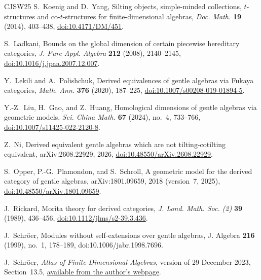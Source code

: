 \documentclass[11pt]{amsart}
\theoremstyle{definition}
\theoremstyle{plain}
\theoremstyle{definition}
\theoremstyle{definition}
\begin{document}
\begin{thebibliography}{CJSW25}
S.~Koenig and D.~Yang,
\newblock Silting objects, simple-minded collections, $t$-structures and
co-$t$-structures for finite-dimensional algebras,
\newblock \emph{Doc. Math.} \textbf{19} (2014), 403--438,
\newblock \href{https://doi.org/10.4171/DM/451}
{doi:10.4171/DM/451}.

S.~Ladkani,
\newblock Bounds on the global dimension of certain piecewise hereditary
categories,
\newblock \emph{J. Pure Appl. Algebra} \textbf{212} (2008), 2140--2145,
\newblock \href{https://doi.org/10.1016/j.jpaa.2007.12.007}
{doi:10.1016/j.jpaa.2007.12.007}.

Y.~Lekili and A.~Polishchuk,
\newblock Derived equivalences of gentle algebras via Fukaya categories,
\newblock \emph{Math. Ann.} \textbf{376} (2020), 187--225,
\newblock \href{https://doi.org/10.1007/s00208-019-01894-5}
{doi:10.1007/s00208-019-01894-5}.

Y.-Z.~Liu, H.~Gao, and Z.~Huang,
\newblock Homological dimensions of gentle algebras via geometric models,
\newblock \emph{Sci. China Math.} \textbf{67} (2024), no.~4, 733--766,
\newblock \href{https://doi.org/10.1007/s11425-022-2120-8}
{doi:10.1007/s11425-022-2120-8}.

Z.~Ni,
\newblock Derived equivalent gentle algebras which are not
tilting-cotilting equivalent,
\newblock arXiv:2608.22929, 2026,
\newblock \href{https://doi.org/10.48550/arXiv.2608.22929}
{doi:10.48550/arXiv.2608.22929}.

S.~Opper, P.-G.~Plamondon, and S.~Schroll,
\newblock A geometric model for the derived category of gentle algebras,
\newblock arXiv:1801.09659, 2018 (version~7, 2025),
\newblock \href{https://doi.org/10.48550/arXiv.1801.09659}
{doi:10.48550/arXiv.1801.09659}.

J.~Rickard,
\newblock Morita theory for derived categories,
\newblock \emph{J. Lond. Math. Soc. (2)} \textbf{39} (1989), 436--456,
\newblock \href{https://doi.org/10.1112/jlms/s2-39.3.436}
{doi:10.1112/jlms/s2-39.3.436}.



J.~Schr\"oer,
Modules without self-extensions over gentle algebras,
J. Algebra \textbf{216} (1999), no.~1, 178--189,
doi:10.1006/jabr.1998.7696.


J.~Schr\"oer,
\newblock \emph{Atlas of Finite-Dimensional Algebras},
\newblock version of 29 December 2023, Section~13.5,
\href{https://www.math.uni-bonn.de/people/schroer/FD-Atlas.htmpl?language=en}
{available from the author's webpage}.


\end{thebibliography}
\end{document}
